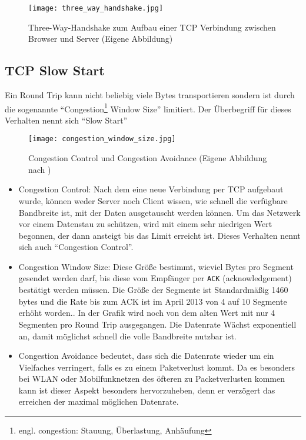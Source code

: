 		\begin{figure}[htbp]
			\begin{center}
				\texttt{[image: three\_way\_handshake.jpg]}
				\caption{Three-Way-Handshake zum Aufbau einer TCP Verbindung zwischen Browser und Server (Eigene Abbildung)}
				\label{fig:three_way_handshake}
			\end{center}
		\end{figure}

	\subsection{TCP Slow Start} %
	\label{sub:tcp_slow_start}

		Ein Round Trip kann nicht beliebig viele Bytes transportieren sondern ist durch die sogenannte "`Congestion\footnote{engl. congestion: Stauung, Überlastung, Anhäufung} Window Size"' limitiert. Der Überbegriff für dieses Verhalten nennt sich "`Slow Start"'

		\begin{figure}[htbp]
			\begin{center}
				\texttt{[image: congestion\_window\_size.jpg]}
				\caption{Congestion Control und Congestion Avoidance (Eigene Abbildung nach \autocite{grigorikSlowStart})}
				\label{fig:congestion_window_size}
			\end{center}
		\end{figure} 

		\begin{itemize}
			\item Congestion Control: Nach dem eine neue Verbindung per TCP aufgebaut wurde, können weder Server noch Client wissen, wie schnell die verfügbare Bandbreite ist, mit der Daten ausgetauscht werden können. Um das Netzwerk vor einem Datenstau zu schützen, wird mit einem sehr niedrigen Wert begonnen, der dann ansteigt bis das Limit erreicht ist. Dieses Verhalten nennt sich auch "`Congestion Control"'.

			\item Congestion Window Size: Diese Größe bestimmt, wieviel Bytes pro Segment gesendet werden darf, bis diese vom Empfänger per \texttt{ACK} (acknowledgement) bestätigt werden müssen. Die Größe der Segmente ist Standardmäßig 1460 bytes und die Rate bis zum ACK ist im April 2013 von 4 auf 10 Segmente erhöht worden.\autocite{grigorikSlowStart}. In der Grafik wird noch von dem alten Wert mit nur 4 Segmenten pro Round Trip ausgegangen. Die Datenrate Wächst exponentiell an, damit möglichst schnell die volle Bandbreite nutzbar ist.

			\item Congestion Avoidance bedeutet, dass sich die Datenrate wieder um ein Vielfaches verringert, falls es zu einem Paketverlust kommt. Da es besonders bei WLAN oder Mobilfunknetzen des öfteren zu Packetverlusten kommen kann ist dieser Aspekt besonders hervorzuheben, denn er verzögert das erreichen der maximal möglichen Datenrate.
		\end{itemize}

